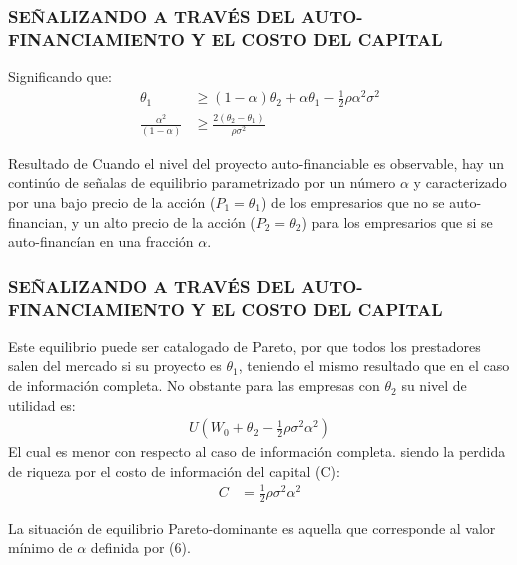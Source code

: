 \begin{frame}
    \frametitle{{\normalsize SEÑALIZANDO A TRAVÉS DEL AUTO-FINANCIAMIENTO Y EL COSTO DEL CAPITAL} {}}
    
  
    Significando que:
     \begin{align}
     \theta_{1}&\geq (1-\alpha)\theta_{2}+\alpha\theta_{1}-\frac{1}{2}\rho \alpha^{2} \sigma^{2} \nonumber \\
     \frac{\alpha^{2}}{(1-\alpha)}&\geq \frac{2(\theta_{2}-\theta_{1})}{\rho \sigma^{2}}
     \end{align} 
      \begin{block} {Resultado de \cite{Leland77}}
         Cuando el nivel del proyecto auto-financiable es observable, hay un continúo de señalas de equilibrio parametrizado por un número $\alpha$ y caracterizado por una bajo precio de la acción ($P_{1}=\theta_{1}$) de los empresarios que no se auto-financian, y un alto precio de la acción ($P_{2}=\theta_{2}$) para los empresarios que si se auto-financían en una fracción $\alpha$.\\      
     \end{block}	
     
      
     
\end{frame}



\begin{frame}
    \frametitle{{\normalsize SEÑALIZANDO A TRAVÉS DEL AUTO-FINANCIAMIENTO Y EL COSTO DEL CAPITAL} {}}
        
    Este equilibrio puede ser catalogado de Pareto, por que todos los prestadores salen del mercado si su proyecto es $\theta_{1} $, teniendo el mismo resultado que en el caso de información completa. No obstante para las empresas con $\theta_{2} $ su nivel de utilidad es:
    \begin{align}
    U(W_{0}+\theta_{2}-\frac{1}{2}\rho \sigma^{2} \alpha^{2})\nonumber
    \end{align} 
    El cual es menor con respecto al caso de información completa. siendo la perdida de riqueza por el costo de información del capital (C):
    \begin{align}
    C&=\frac{1}{2}\rho \sigma^{2} \alpha^{2}\nonumber
    \end{align} 
    
    La situación de equilibrio Pareto-dominante es aquella que corresponde al valor mínimo de $\alpha$ definida por (6).
    
\end{frame}

